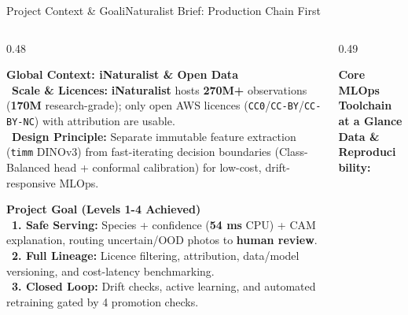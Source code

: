 \documentclass[aspectratio=169,10pt]{beamer}
\begin{document}
\begin{frame}{Project Context \& Goal}{iNaturalist Brief: Production Chain First}
    \begin{columns}[c]
        \begin{column}{0.48\textwidth}
            \begin{card}
                \textbf{\color{BlueAccent} Global Context: iNaturalist \& Open Data}\\[2pt]
                \textbullet\ \textbf{Scale \& Licences:} \textbf{iNaturalist} hosts \textbf{270M+} observations (\textbf{170M} research-grade); only open AWS licences (\texttt{CC0}/\texttt{CC-BY}/\texttt{CC-BY-NC}) with attribution are usable.\\[2pt]
                \textbullet\ \textbf{Design Principle:} Separate immutable feature extraction (\texttt{timm} DINOv3) from fast-iterating decision boundaries (Class-Balanced head + conformal calibration) for low-cost, drift-responsive MLOps.
            \end{card}
            \vspace{0.05cm}
            \begin{greencard}
                \textbf{\color{GreenAccent} Project Goal (Levels 1-4 Achieved)}\\[2pt]
                \textbullet\ \textbf{1. Safe Serving:} Species + confidence (\textbf{54 ms} CPU) + CAM explanation, routing uncertain/OOD photos to \textbf{human review}.\\[2pt]
                \textbullet\ \textbf{2. Full Lineage:} Licence filtering, attribution, data/model versioning, and cost-latency benchmarking.\\[2pt]
                \textbullet\ \textbf{3. Closed Loop:} Drift checks, active learning, and automated retraining gated by 4 promotion checks.
            \end{greencard}
        \end{column}
        \begin{column}{0.49\textwidth}
            \begin{bluecard}
                \textbf{\color{SlateDark} Core MLOps Toolchain at a Glance}\\[3pt]
                \textbf{\color{TealAccent} Data \& Reproducibility:}\\[1.5pt]

\end{bluecard}
\end{column}
\end{columns}
\end{frame}
\end{document}
